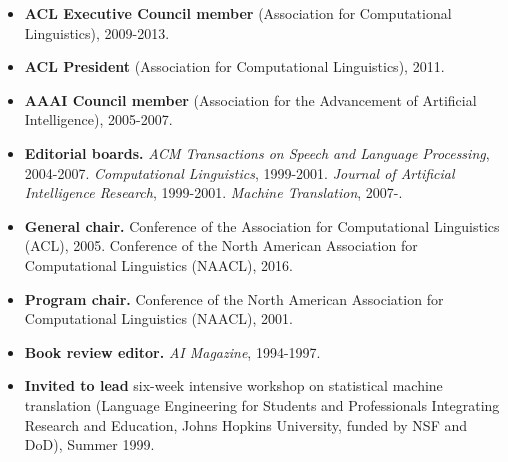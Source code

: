 
\begin{itemize}

\item {\bf ACL Executive Council member} (Association for Computational
Linguistics), 2009-2013.

\item {\bf ACL President} (Association for Computational Linguistics), 2011.

\item {\bf AAAI Council member} (Association for the Advancement of
Artificial Intelligence), 2005-2007.

\item {\bf Editorial boards.}  
 {\em ACM Transactions on Speech and Language Processing}, 2004-2007.
 {\em Computational Linguistics}, 1999-2001.
 {\em Journal of Artificial Intelligence Research}, 1999-2001.
 {\em Machine Translation}, 2007-.

\item {\bf General chair.}  Conference of the Association
for Computational Linguistics (ACL), 2005.
Conference of the North American Association
for Computational Linguistics (NAACL), 2016.

\item {\bf Program chair.}  Conference of the North American Association
for Computational Linguistics (NAACL), 2001.


\item {\bf Book review editor.}  {\em AI Magazine}, 1994-1997.

\item {\bf Invited to lead} six-week intensive workshop on statistical
machine translation (Language Engineering for Students 
and Professionals Integrating Research and Education,
Johns Hopkins University, funded by NSF and DoD), Summer 1999.

\end{itemize}

